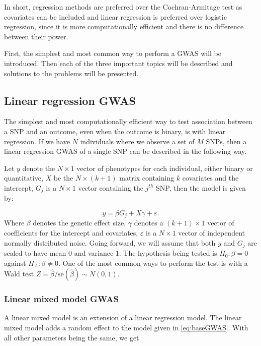 In short, regression methods are preferred over the Cochran-Armitage test as covariates can be included and linear regression is preferred over logistic regression, since it is more computationally efficient and there is no difference between their power\cite{sikorska2013gwas,prive2019making,balding2006tutorial}.

First, the simplest and most common way to perform a GWAS will be introduced. Then each of the three important topics will be described and solutions to the problems will be presented.

\subsection{Linear regression GWAS}
The simplest and most computationally efficient way to test association between a SNP and an outcome, even when the outcome is binary, is with linear regression. If we have $ N $ individuals where we observe a set of $ M $ SNPs, then a linear regression GWAS of a single SNP can be described in the following way.

Let $ y $ denote the $ N\times1 $ vector of phenotypes for each individual, either binary or quantitative, $ X $ be the $ N \times (k+1) $ matrix containing $ k $ covariates and the intercept, $ G_j $ is a $ N\times 1 $ vector containing the $ j^{th} $ SNP, then the model is given by:

\begin{equation}\label{eq:baseGWAS}
y = \beta G_{j} +  X\gamma + \varepsilon.
\end{equation}
Where $ \beta $ denotes the genetic effect size, $ \gamma $ denotes a $ (k + 1) \times 1$ vector of coefficients for the intercept and covariates, $ \varepsilon $ is a $ N \times 1 $ vector of independent normally distributed noise. Going forward, we will assume that both $ y $ and $ G_j $ are scaled to have mean $ 0 $ and variance $ 1 $. The hypothesis being tested is $ H_0: \beta = 0 $ against $ H_A: \beta \neq 0 $. One of the most common ways to perform the test is with a Wald test $ Z = \hat{\beta}/\text{se}(\hat{\beta}) \sim N(0,1)$. 



\subsubsection{Linear mixed model GWAS}
A linear mixed model is an extension of a linear regression model. The linear mixed model adds a random effect to the model given in \cref{eq:baseGWAS}. With all other parameters being the same, we get


